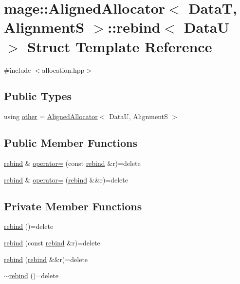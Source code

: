\hypertarget{structmage_1_1_aligned_allocator_1_1rebind}{}\section{mage\+:\+:Aligned\+Allocator$<$ DataT, AlignmentS $>$\+:\+:rebind$<$ DataU $>$ Struct Template Reference}
\label{structmage_1_1_aligned_allocator_1_1rebind}


{\ttfamily \#include $<$allocation.\+hpp$>$}

\subsection*{Public Types}
\begin{DoxyCompactItemize}
\item 
using \hyperlink{structmage_1_1_aligned_allocator_1_1rebind_aeb2e9c9add001b8f603f5b67ad8fee56}{other} = \hyperlink{structmage_1_1_aligned_allocator}{Aligned\+Allocator}$<$ DataU, AlignmentS $>$
\end{DoxyCompactItemize}
\subsection*{Public Member Functions}
\begin{DoxyCompactItemize}
\item 
\hyperlink{structmage_1_1_aligned_allocator_1_1rebind}{rebind} \& \hyperlink{structmage_1_1_aligned_allocator_1_1rebind_a32b474cf072c192715654d74b639c9f7}{operator=} (const \hyperlink{structmage_1_1_aligned_allocator_1_1rebind}{rebind} \&r)=delete
\item 
\hyperlink{structmage_1_1_aligned_allocator_1_1rebind}{rebind} \& \hyperlink{structmage_1_1_aligned_allocator_1_1rebind_a79fa8e41d87f7560eb74aaec7eecb191}{operator=} (\hyperlink{structmage_1_1_aligned_allocator_1_1rebind}{rebind} \&\&r)=delete
\end{DoxyCompactItemize}
\subsection*{Private Member Functions}
\begin{DoxyCompactItemize}
\item 
\hyperlink{structmage_1_1_aligned_allocator_1_1rebind_a2b26e5afbed6b26f73ed0186c2ff52d6}{rebind} ()=delete
\item 
\hyperlink{structmage_1_1_aligned_allocator_1_1rebind_a3ec1fb665819e0061c26e2366861f64a}{rebind} (const \hyperlink{structmage_1_1_aligned_allocator_1_1rebind}{rebind} \&r)=delete
\item 
\hyperlink{structmage_1_1_aligned_allocator_1_1rebind_a863c98bf6c924e65e9d972ce93fccefc}{rebind} (\hyperlink{structmage_1_1_aligned_allocator_1_1rebind}{rebind} \&\&r)=delete
\item 
\hyperlink{structmage_1_1_aligned_allocator_1_1rebind_a6d49df31fc4f0a5122267be6ab8888a7}{$\sim$rebind} ()=delete
\end{DoxyCompactItemize}



